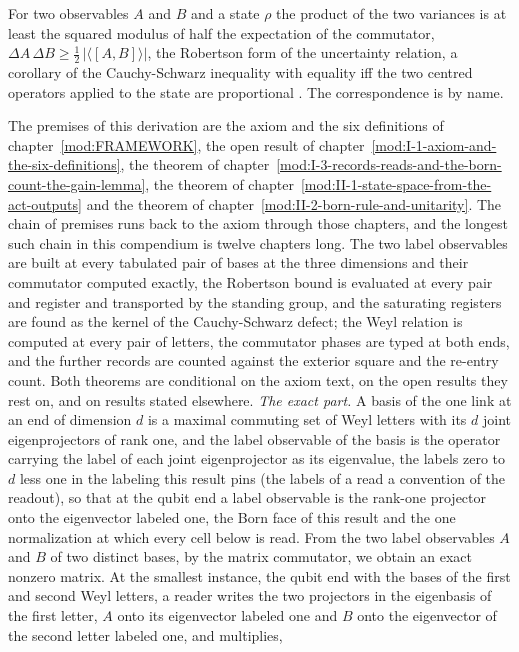 \begin{chbridge}
For two observables $A$ and $B$ and a state $\rho$ the product of the two variances is at least the squared modulus of half the expectation of the commutator, $\Delta A\,\Delta B \geq \tfrac{1}{2}\,|\langle [A,B]\rangle|$, the Robertson form of the uncertainty relation, a corollary of the Cauchy-Schwarz inequality with equality iff the two centred operators applied to the state are proportional \cite{Robertson1929}. The correspondence is by name.
\end{chbridge}
\begin{chproof}
The premises of this derivation are the axiom and the six definitions of chapter~\ref{mod:FRAMEWORK}, the open result of chapter~\ref{mod:I-1-axiom-and-the-six-definitions}, the theorem of chapter~\ref{mod:I-3-records-reads-and-the-born-count-the-gain-lemma}, the theorem of chapter~\ref{mod:II-1-state-space-from-the-act-outputs} and the theorem of chapter~\ref{mod:II-2-born-rule-and-unitarity}. The chain of premises runs back to the axiom through those chapters, and the longest such chain in this compendium is twelve chapters long.
The two label observables are built at every tabulated pair of bases at the three dimensions and their commutator computed exactly, the Robertson bound is evaluated at every pair and register and transported by the standing group, and the saturating registers are found as the kernel of the Cauchy-Schwarz defect; the Weyl relation is computed at every pair of letters, the commutator phases are typed at both ends, and the further records are counted against the exterior square and the re-entry count. Both theorems are conditional on the axiom text, on the open results they rest on, and on results stated elsewhere.
\textit{The exact part.}
A basis of the one link at an end of dimension $d$ is a maximal commuting set of Weyl letters with its $d$ joint eigenprojectors of rank one, and the label observable of the basis is the operator carrying the label of each joint eigenprojector as its eigenvalue, the labels zero to $d$ less one in the labeling this result pins (the labels of a read a convention of the readout), so that at the qubit end a label observable is the rank-one projector onto the eigenvector labeled one, the Born face of this result and the one normalization at which every cell below is read. From the two label observables $A$ and $B$ of two distinct bases, by the matrix commutator, we obtain an exact nonzero matrix. At the smallest instance, the qubit end with the bases of the first and second Weyl letters, a reader writes the two projectors in the eigenbasis of the first letter, $A$ onto its eigenvector labeled one and $B$ onto the eigenvector of the second letter labeled one, and multiplies,

\end{chproof}
